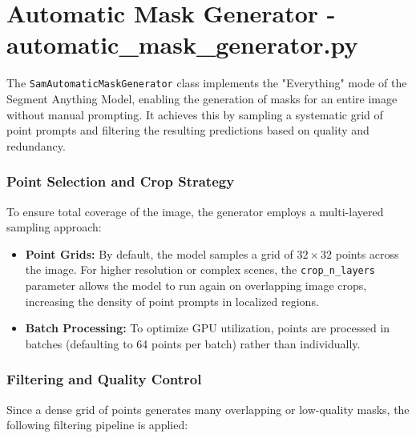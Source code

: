 \section{Automatic Mask Generator -\\ automatic\_mask\_generator.py}
The \texttt{SamAutomaticMaskGenerator} class implements the "Everything" mode of the Segment Anything Model, enabling the generation of masks for an entire image without manual prompting. It achieves this by sampling a systematic grid of point prompts and filtering the resulting predictions based on quality and redundancy.

\subsubsection{Point Selection and Crop Strategy}
To ensure total coverage of the image, the generator employs a multi-layered sampling approach:

\begin{itemize}
	\item \textbf{Point Grids:} By default, the model samples a grid of $32 \times 32$ points across the image. For higher resolution or complex scenes, the \texttt{crop\_n\_layers} parameter allows the model to run again on overlapping image crops, increasing the density of point prompts in localized regions.
	
	\item \textbf{Batch Processing:} To optimize GPU utilization, points are processed in batches (defaulting to 64 points per batch) rather than individually.
\end{itemize}

\subsubsection{Filtering and Quality Control}
Since a dense grid of points generates many overlapping or low-quality masks, the following filtering pipeline is applied:

